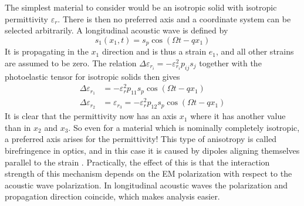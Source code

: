 \documentclass[11pt,twoside]{eitExjobb}
\begin{document}
	The simplest material to consider would be an isotropic solid with isotropic permittivity $\varepsilon_r$. There is then no preferred axis and a coordinate system can be selected arbitrarily. A longitudinal acoustic wave is defined by \begin{equation*}
		s_1(x_1,t) = s_p \cos(\Omega t - qx_1)
	\end{equation*}
	It is propagating in the $x_1$ direction and is thus a strain $e_1$, and all other strains are assumed to be zero. The relation $\Delta \varepsilon_{r_i} = -\varepsilon_{r_i}^2 p_{ij} s_j$ together with the photoelastic tensor for isotropic solids then gives
	\begin{align*}
		\Delta \varepsilon_{r_1} &= -\varepsilon_r^2 p_{11} s_p \cos(\Omega t - qx_1)\\
		\Delta \varepsilon_{r_2} &= \varepsilon_{r_3} = -\varepsilon_r^2 p_{12} s_p \cos(\Omega t - qx_1)
	\end{align*}
	It is clear that the permittivity now has an axis $x_1$ where it has another value than in $x_2$ and $x_3$. So even for a material which is nominally completely isotropic, a preferred axis arises for the permittivity! This type of anisotropy is called birefringence in optics, and in this case it is caused by dipoles aligning themselves parallel to the strain \cite{Korpel1988}. Practically, the effect of this is that the interaction strength of this mechanism depends on the EM polarization with respect to the acoustic wave polarization. In longitudinal acoustic waves the polarization and propagation direction coincide, which makes analysis easier.
	
\end{document}
